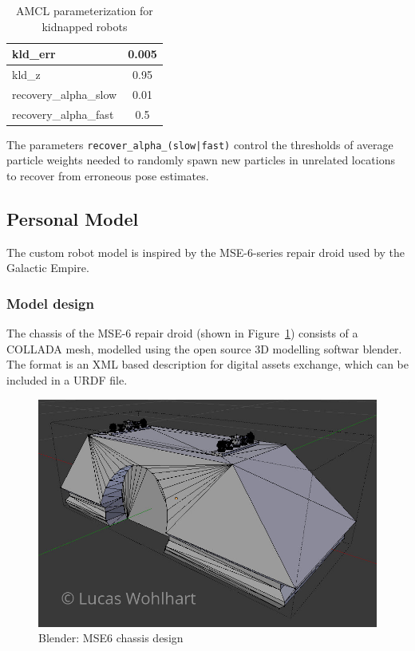 \documentclass[10pt,journal,compsoc]{IEEEtran}
\begin{document}
\begin{table}[h]
      \caption{AMCL parameterization for kidnapped robots}
      \label{tab:amcl_parameterization_kidnapped}
      \begin{center}
            \begin{tabular}{|l|c|}  \hline
      kld\_err & 0.005 \\ \hline
      kld\_z & 0.95\\ \hline
      recovery\_alpha\_slow & 0.01  \\ \hline
      recovery\_alpha\_fast & 0.5  \\ \hline
      \end{tabular}
\end{center}
\end{table}        
The parameters \texttt{recover\_alpha\_(slow|fast)} control the thresholds of average particle weights needed to randomly spawn new particles in unrelated locations to recover from erroneous pose estimates.

\subsection{Personal Model}
The custom robot model is inspired by the MSE-6-series repair droid\cite{MSE-6-series-droid} used by the Galactic Empire. 
\subsubsection{Model design}
The chassis of the MSE-6 repair droid (shown in Figure~\ref{fig:blender_design_mse6}) consists of a COLLADA mesh, modelled using the open source 3D modelling softwar blender\cite{Blender}. The format is an XML based description for digital assets exchange, which can be included in a URDF file.

\begin{figure}[thpb]
      \centering
      \includegraphics[width=\linewidth]{img/blender_mse6_chassis}
      \caption{Blender: MSE6 chassis design}
      \label{fig:blender_design_mse6}
\end{figure}
\end{document}
